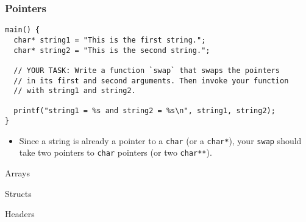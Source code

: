 \documentclass[pdf]{beamer}
\begin{document}
\begin{frame}[fragile]
  \frametitle{Pointers}

\begin{verbatim}
main() {
  char* string1 = "This is the first string.";
  char* string2 = "This is the second string.";

  // YOUR TASK: Write a function `swap` that swaps the pointers
  // in its first and second arguments. Then invoke your function
  // with string1 and string2.

  printf("string1 = %s and string2 = %s\n", string1, string2);
}
\end{verbatim}

  \begin{itemize}
  \item Since a string is already a pointer to a \texttt{char} (or a \texttt{char*}), your
    \texttt{swap} should take two pointers to \texttt{char} pointers (or two
    \texttt{char**}). \pause
  \end{itemize}

\end{frame}

\begin{frame}{Arrays}

\end{frame}

\begin{frame}{Structs}

\end{frame}

\begin{frame}{Headers}

\end{frame}
\end{document}
